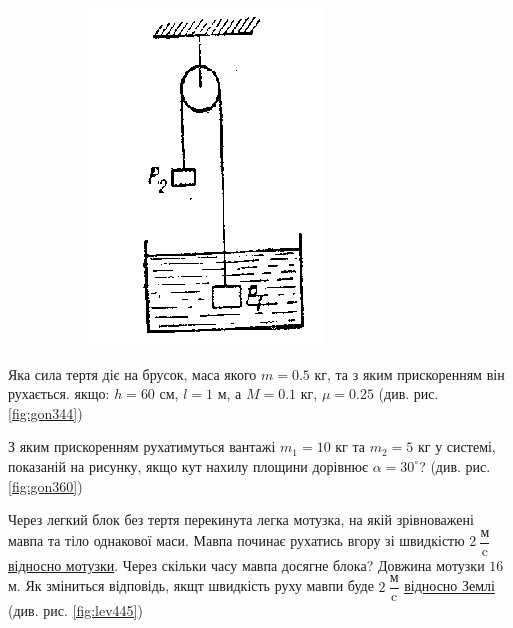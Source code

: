 \begin{problem}{3}
\begin{figure}[h!]
\begin{subfigure}{.4\textwidth}
		\caption{}
		\label{fig:lev453}
	\end{subfigure}
	\begin{subfigure}{.4\textwidth}
		\centering
		\includegraphics[width=0.5\linewidth]{class7/gonch_150}
		\caption{}
		\label{fig:gonch150}
	\end{subfigure}
	\caption{}
\end{figure}
\end{problem}

\begin{problem}{4}
	Яка сила тертя діє на брусок, маса якого $m = 0.5$ кг, та з яким прискоренням він рухається. якщо: $h = 60$ см, $l = 1$ м, а $M = 0.1$ кг, $\mu = 0.25$ (див. рис. \ref{fig:gon344})
\end{problem}

\begin{problem}{5}
	З яким прискоренням рухатимуться вантажі $m_1 = 10$ кг та $m_2 = 5$ кг у системі, показаній на рисунку, якщо кут нахилу площини дорівнює $\alpha = 30^{\circ}$? (див. рис. \ref{fig:gon360})
\end{problem}





\begin{problem}{8}
	Через легкий блок без тертя перекинута легка мотузка, на якій зрівноважені мавпа та тіло однакової маси. Мавпа починає рухатись вгору зі швидкістю $2~\dfrac{\text{м}}{\text{c}}$ \underline{відносно мотузки}. Через скільки часу мавпа досягне блока? Довжина мотузки $16$ м. Як зміниться відповідь, якщт швидкість руху мавпи буде $2~\dfrac{\text{м}}{\text{c}}$ \underline{відносно Землі} (див. рис. \ref{fig:lev445})	

\end{problem}



